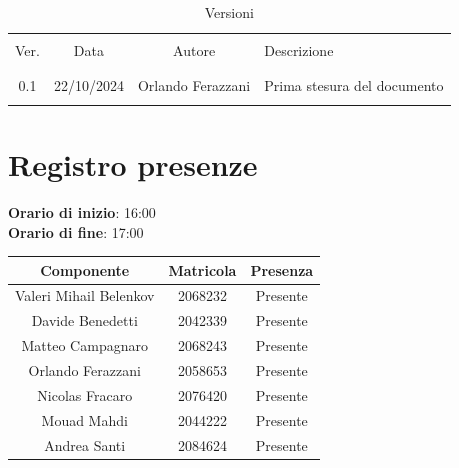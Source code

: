 \documentclass[italian, 12pt]{article}
\begin{document}
\pagestyle{mystyle}


\begin{table}[!h]
	\caption{Versioni}
	\begin{center}
		\begin{tabular}{ c c c p{9cm}}
			\hline \\[-2ex]
			Ver. & Data & Autore & Descrizione \\
			\\[-2ex] \hline \\[-1.5ex]
			0.1 & 22/10/2024 & Orlando Ferazzani& Prima stesura del documento\\
			\\[-1.5ex] \hline
		\end{tabular}
	\end{center}
\end{table}


\tableofcontents
\newpage


\section{Registro presenze}

\textbf{Orario di inizio}: 16:00\\
\textbf{Orario di fine}: 17:00\\


\begin{flushleft}
	\begin{table}[!h]
	\begin{tabular}{ |c|c|c| } 
		\hline
		\textbf{Componente} & \textbf{Matricola} & \textbf{Presenza} \\
  \hline 
		Valeri Mihail Belenkov & 2068232 & Presente \\ 
		Davide Benedetti 	& 2042339 & Presente \\
		Matteo Campagnaro	& 2068243 & Presente \\
		Orlando Ferazzani 	& 2058653 & Presente \\
		Nicolas Fracaro 	& 2076420 & Presente \\
		Mouad Mahdi		    & 2044222 & Presente \\ 
		Andrea Santi 	    & 2084624 & Presente \\
		\hline
	\end{tabular}
	\end{table}
	\end{flushleft}
\end{document}
